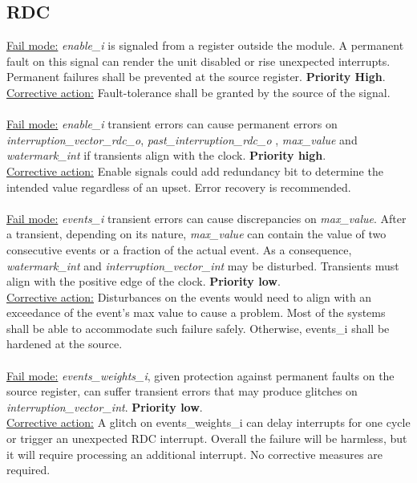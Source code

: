 \subsection{RDC}
\underline{Fail mode:} \textit{enable\_i}  is signaled from a register outside the module. A permanent fault on this signal can render the unit disabled or rise unexpected interrupts. Permanent failures shall be prevented at the source register. \textbf{Priority High}.\\
\underline{Corrective action:} Fault-tolerance shall be granted by the source of the signal.\\
\\
\underline{Fail mode:} \textit{enable\_i} transient errors can cause permanent errors on \textit{interruption\_vector\_rdc\_o}, \textit{past\_interruption\_rdc\_o} ,\textit{ max\_value} and \textit{watermark\_int} if transients align with the clock. \textbf{Priority high}.\\
\underline{Corrective action:} Enable signals could add redundancy bit to determine the intended value regardless of an upset. Error recovery is recommended.\\
\\
\underline{Fail mode:} \textit{events\_i} transient errors can cause discrepancies on \textit{max\_value}.  After a transient, depending on its nature,  \textit{max\_value} can contain the value of two consecutive events or a fraction of the actual event. As a consequence, \textit{watermark\_int} and \textit{interruption\_vector\_int} may be disturbed. Transients must align with the positive edge of the clock. \textbf{Priority low}.\\
\underline{Corrective action:} Disturbances on the events would need to align with an exceedance of the event's max value to cause a problem. Most of the systems shall be able to accommodate such failure safely. Otherwise, events\_i shall be hardened at the source.\\
\\
\underline{Fail mode:} \textit{events\_weights\_i}, given protection against permanent faults on the source register, can suffer transient errors that may produce glitches on \textit{interruption\_vector\_int}.\textbf{ Priority low}.\\
\underline{Corrective action:} A glitch on events\_weights\_i can delay interrupts for one cycle or trigger an unexpected RDC interrupt. Overall the failure will be harmless, but it will require processing an additional interrupt. No corrective measures are required. \\
